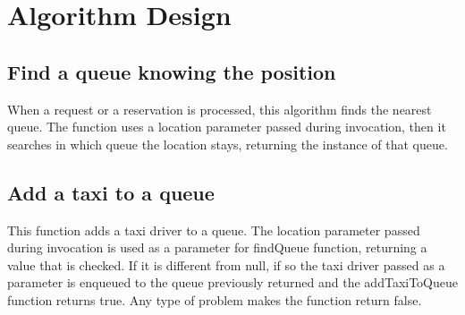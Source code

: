 \break
\section{Algorithm Design}
\label{sec:algo}
\subsection{Find a queue knowing the position}
\begin{algorithm}[H]
	 {
		\BlankLine
		\;
	}
\end{algorithm}
When a request or a reservation is processed, this algorithm finds the nearest queue. The function uses a location parameter passed during invocation, then it searches in which queue the location stays, returning the instance of that queue.
\subsection{Add a taxi to a queue}
\begin{algorithm}[H]
\end{algorithm}
This function adds a taxi driver to a queue. The location parameter passed during invocation is used as a parameter for findQueue function, returning a value that is checked. If it is different from null, if so the taxi driver passed as a parameter is enqueued to the queue previously returned and the addTaxiToQueue function returns true. Any type of problem makes the function return false.  
